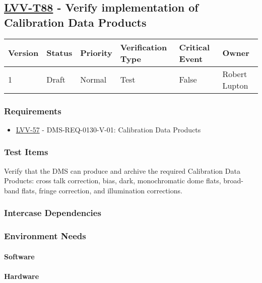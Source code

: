 \subsection{\href{https://jira.lsstcorp.org/secure/Tests.jspa\#/testCase/LVV-T88}{LVV-T88}
    - Verify implementation of Calibration Data Products}\label{lvv-t88}

\begin{longtable}[]{llllll}
\toprule
Version & Status & Priority & Verification Type & Critical Event & Owner
\\\midrule
1 & Draft & Normal &
Test & False & Robert Lupton
\\\bottomrule
\end{longtable}

\subsubsection{Requirements}
\begin{itemize}
\item \href{https://jira.lsstcorp.org/browse/LVV-57}{LVV-57} - DMS-REQ-0130-V-01: Calibration Data Products
\end{itemize}

\subsubsection{Test Items}
Verify that the DMS can produce and archive the required Calibration
Data Products: cross talk correction, bias, dark, monochromatic dome
flats, broad-band flats, fringe correction, and illumination
corrections.



\subsubsection{Intercase Dependencies}

\subsubsection{Environment Needs}

\paragraph{Software}

\paragraph{Hardware}

